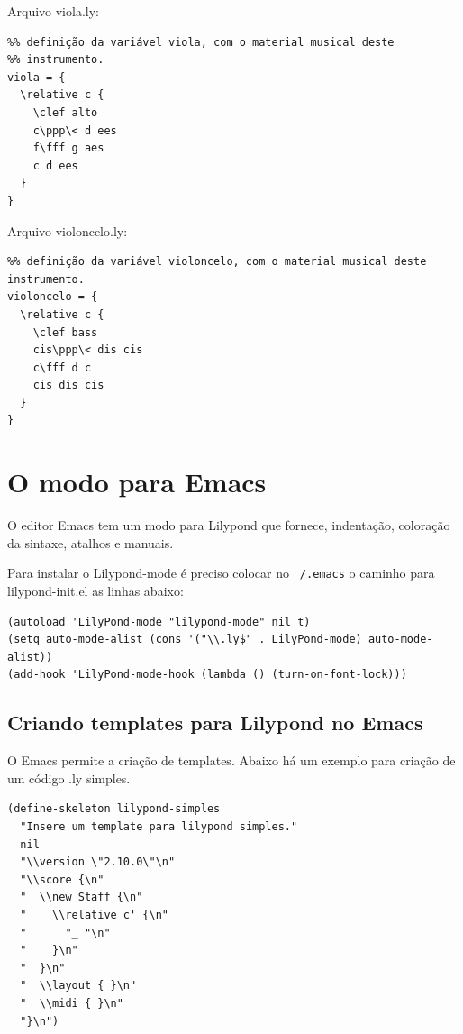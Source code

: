 \documentclass[12pt,brazil]{book}
\begin{document}
Arquivo viola.ly:

\begin{verbatim}
%% definição da variável viola, com o material musical deste
%% instrumento.
viola = {
  \relative c {
    \clef alto
    c\ppp\< d ees
    f\fff g aes
    c d ees
  }
}
\end{verbatim}

Arquivo violoncelo.ly:

\begin{verbatim}
%% definição da variável violoncelo, com o material musical deste instrumento.
violoncelo = {
  \relative c {
    \clef bass
    cis\ppp\< dis cis
    c\fff d c
    cis dis cis
  }
}
\end{verbatim}

\section{O modo para Emacs}
\label{sec:o-modo-para-3}

O editor Emacs tem um modo para Lilypond que fornece, indentação,
coloração da sintaxe, atalhos e manuais.

Para instalar o Lilypond-mode é preciso colocar no \texttt{~/.emacs} o
caminho para lilypond-init.el as linhas abaixo:

\begin{verbatim}
(autoload 'LilyPond-mode "lilypond-mode" nil t)
(setq auto-mode-alist (cons '("\\.ly$" . LilyPond-mode) auto-mode-alist))
(add-hook 'LilyPond-mode-hook (lambda () (turn-on-font-lock)))
\end{verbatim}

\subsection{Criando templates para Lilypond no Emacs}
\label{sec:criando-templ-para}

O Emacs permite a criação de templates. Abaixo há um exemplo para
criação de um código .ly simples.

\begin{verbatim}
(define-skeleton lilypond-simples
  "Insere um template para lilypond simples."
  nil
  "\\version \"2.10.0\"\n"
  "\\score {\n"
  "  \\new Staff {\n"
  "    \\relative c' {\n"
  "      "_ "\n"
  "    }\n"
  "  }\n"
  "  \\layout { }\n"
  "  \\midi { }\n"
  "}\n")
\end{verbatim}
\end{document}
